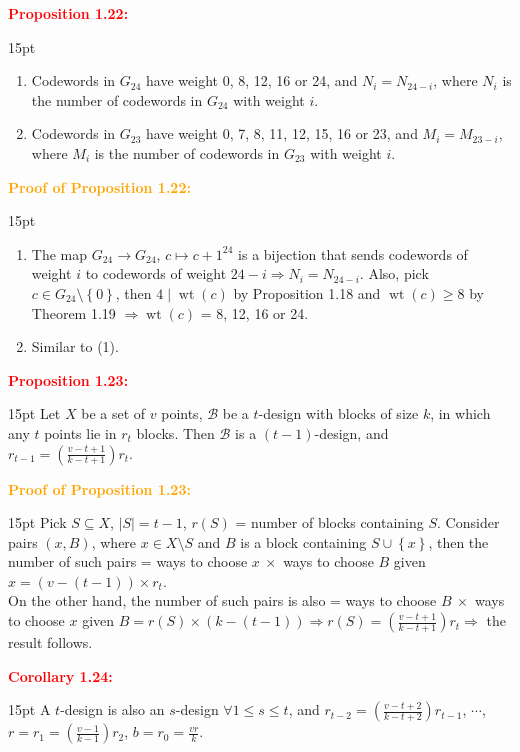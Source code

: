 \documentclass[12pt]{article}
\newcommand{\noparskip}{\vspace{-\parskip}}
\newenvironment{points}
	{\begin{enumerate}[label = (\arabic*)]}
	{\end{enumerate}}
\newenvironment{dent}
	{\begin{adjustwidth}{15pt}{}\noparskip}
	{\end{adjustwidth}}
\newenvironment{result}[1]
	{\textcolor{Red}{\textbf{#1:}}\begin{dent}}
	{\end{dent}}
\newenvironment{proof}[1]
	{\textcolor{Orange}{\textbf{Proof of #1:}}\begin{dent}}
	{\end{dent}}
\renewcommand{\implies}{\Rightarrow}
\newcommand{\set}[1]{\left\{ #1 \right\}}
\newcommand{\sizeof}[1]{\left| #1 \right|}
\newcommand{\cB}{\mathcal{B}}
\newcommand{\wt}[1]{\operatorname{wt}(#1)}
\begin{document}
\begin{result}{Proposition 1.22}
\begin{points}
\item Codewords in $G_{24}$ have weight 0, 8, 12, 16 or 24, and $N_i = N_{24 - i}$, where $N_i$ is the number of codewords in $G_{24}$ with weight $i$.
\item Codewords in $G_{23}$ have weight 0, 7, 8, 11, 12, 15, 16 or 23, and $M_i = M_{23 - i}$, where $M_i$ is the number of codewords in $G_{23}$ with weight $i$.
\end{points}
\end{result}

\begin{proof}{Proposition 1.22}
\begin{points}
\item The map $G_{24} \rightarrow G_{24}$, $c \mapsto c + 1^{24}$ is a bijection that sends codewords of weight $i$ to codewords of weight $24 - i \implies N_i = N_{24 - i}$. Also, pick $c \in G_{24} \setminus \set{0}$, then $4 \mid \wt{c}$ by Proposition 1.18 and $\wt{c} \ge 8$ by Theorem 1.19 $\implies \wt{c}$ = 8, 12, 16 or 24.
\item Similar to (1).
\end{points}
\end{proof}

\begin{result}{Proposition 1.23}
Let $X$ be a set of $v$ points, $\cB$ be a $t$-design with blocks of size $k$, in which any $t$ points lie in $r_t$ blocks. Then $\cB$ is a $(t - 1)$-design, and $r_{t - 1} = \left( \frac{v - t + 1}{k - t + 1} \right) r_t$.
\end{result}

\begin{proof}{Proposition 1.23}
Pick $S \subseteq X$, $\sizeof{S} = t - 1$, $r(S)$ = number of blocks containing $S$. Consider pairs $(x, B)$, where $x \in X \setminus S$ and $B$ is a block containing $S \cup \set{x}$, then the number of such pairs = ways to choose $x\ \times$ ways to choose $B$ given $x = (v - (t - 1)) \times r_t$. \\
On the other hand, the number of such pairs is also = ways to choose $B\ \times$ ways to choose $x$ given $B = r(S) \times (k - (t - 1)) \implies r(S) = \left( \frac{v - t + 1}{k - t + 1} \right) r_t \implies$ the result follows.
\end{proof}

\begin{result}{Corollary 1.24}
A $t$-design is also an $s$-design $\forall 1 \le s \le t$, and $r_{t - 2} = \left( \frac{v - t + 2}{k - t + 2} \right) r_{t - 1}$, $\cdots$, $r = r_1 = \left( \frac{v - 1}{k - 1} \right) r_2$, $b = r_0 = \frac{vr}{k}$.
\end{result}
\end{document}
